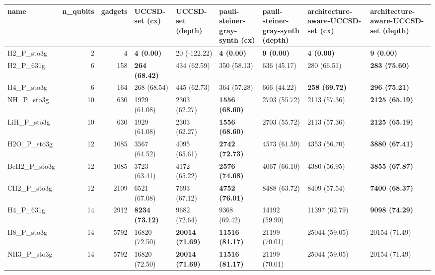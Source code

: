 \begin{tabular}{lrrllllll}
\toprule
name & n\_qubits & gadgets & UCCSD-set (cx) & UCCSD-set (depth) & pauli-steiner-gray-synth (cx) & pauli-steiner-gray-synth (depth) & architecture-aware-UCCSD-set (cx) & architecture-aware-UCCSD-set (depth) \\
\midrule
H2\_P\_sto3g & 2 & 4 & \textbf{4 (0.00)} & 20 (-122.22) & \textbf{4 (0.00)} & \textbf{9 (0.00)} & \textbf{4 (0.00)} & \textbf{9 (0.00)} \\
H2\_P\_631g & 6 & 158 & \textbf{264 (68.42)} & 434 (62.59) & 350 (58.13) & 636 (45.17) & 280 (66.51) & \textbf{283 (75.60)} \\
H4\_P\_sto3g & 6 & 164 & 268 (68.54) & 445 (62.73) & 364 (57.28) & 666 (44.22) & \textbf{258 (69.72)} & \textbf{296 (75.21)} \\
NH\_P\_sto3g & 10 & 630 & 1929 (61.08) & 2303 (62.27) & \textbf{1556 (68.60)} & 2703 (55.72) & 2113 (57.36) & \textbf{2125 (65.19)} \\
LiH\_P\_sto3g & 10 & 630 & 1929 (61.08) & 2303 (62.27) & \textbf{1556 (68.60)} & 2703 (55.72) & 2113 (57.36) & \textbf{2125 (65.19)} \\
H2O\_P\_sto3g & 12 & 1085 & 3567 (64.52) & 4095 (65.61) & \textbf{2742 (72.73)} & 4573 (61.59) & 4353 (56.70) & \textbf{3880 (67.41)} \\
BeH2\_P\_sto3g & 12 & 1085 & 3723 (63.41) & 4172 (65.22) & \textbf{2576 (74.68)} & 4067 (66.10) & 4380 (56.95) & \textbf{3855 (67.87)} \\
CH2\_P\_sto3g & 12 & 2109 & 6521 (67.08) & 7693 (67.12) & \textbf{4752 (76.01)} & 8488 (63.72) & 8409 (57.54) & \textbf{7400 (68.37)} \\
H4\_P\_631g & 14 & 2912 & \textbf{8234 (73.12)} & 9682 (72.64) & 9368 (69.42) & 14192 (59.90) & 11397 (62.79) & \textbf{9098 (74.29)} \\
H8\_P\_sto3g & 14 & 5792 & 16820 (72.50) & \textbf{20014 (71.69)} & \textbf{11516 (81.17)} & 21199 (70.01) & 25044 (59.05) & 20154 (71.49) \\
NH3\_P\_sto3g & 14 & 5792 & 16820 (72.50) & \textbf{20014 (71.69)} & \textbf{11516 (81.17)} & 21199 (70.01) & 25044 (59.05) & 20154 (71.49) \\
\bottomrule
\end{tabular}
